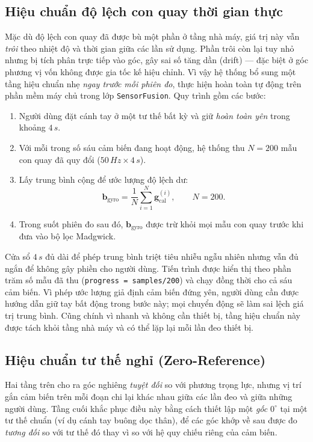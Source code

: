 \documentclass[../DoAn.tex]{subfiles}
\begin{document}
\subsection{Hiệu chuẩn độ lệch con quay thời gian thực}
\label{subsec:impl_runtime}
Mặc dù độ lệch con quay đã được bù một phần ở tầng nhà máy, giá trị này vẫn \emph{trôi} theo nhiệt độ và thời gian giữa các lần sử dụng. Phần trôi còn lại tuy nhỏ nhưng bị tích phân trực tiếp vào góc, gây sai số tăng dần (drift) --- đặc biệt ở góc phương vị vốn không được gia tốc kế hiệu chỉnh. Vì vậy hệ thống bổ sung một tầng hiệu chuẩn nhẹ \emph{ngay trước mỗi phiên đo}, thực hiện hoàn toàn tự động trên phần mềm máy chủ trong lớp \texttt{SensorFusion}. Quy trình gồm các bước:
\begin{enumerate}
    \item Người dùng đặt cánh tay ở một tư thế bất kỳ và giữ \emph{hoàn toàn yên} trong khoảng $4\,\si{s}$.
    \item Với mỗi trong số sáu cảm biến đang hoạt động, hệ thống thu $N = 200$ mẫu con quay đã quy đổi ($50\,\si{Hz}\times 4\,\si{s}$).
    \item Lấy trung bình cộng để ước lượng độ lệch dư:
          \begin{equation}
              \mathbf{b}_{\mathrm{gyro}} = \frac{1}{N}\sum_{i=1}^{N}\mathbf{g}_{\mathrm{cal}}^{(i)}, \qquad N = 200.
              \label{eq:runtimebias}
          \end{equation}
    \item Trong suốt phiên đo sau đó, $\mathbf{b}_{\mathrm{gyro}}$ được trừ khỏi mọi mẫu con quay trước khi đưa vào bộ lọc Madgwick.
\end{enumerate}
Cửa sổ $4\,\si{s}$ đủ dài để phép trung bình triệt tiêu nhiễu ngẫu nhiên nhưng vẫn đủ ngắn để không gây phiền cho người dùng. Tiến trình được hiển thị theo phần trăm số mẫu đã thu (\texttt{progress = samples/200}) và chạy đồng thời cho cả sáu cảm biến. Vì phép ước lượng giả định cảm biến đứng yên, người dùng cần được hướng dẫn giữ tay bất động trong bước này; mọi chuyển động sẽ làm sai lệch giá trị trung bình. Cũng chính vì nhanh và không cần thiết bị, tầng hiệu chuẩn này được tách khỏi tầng nhà máy và có thể lặp lại mỗi lần đeo thiết bị.

\subsection{Hiệu chuẩn tư thế nghỉ (Zero-Reference)}
\label{subsec:impl_zeroref}
Hai tầng trên cho ra góc nghiêng \emph{tuyệt đối} so với phương trọng lực, nhưng vị trí gắn cảm biến trên mỗi đoạn chi lại khác nhau giữa các lần đeo và giữa những người dùng. Tầng cuối khắc phục điều này bằng cách thiết lập một \emph{gốc} $0^{\circ}$ tại một tư thế chuẩn (ví dụ cánh tay buông dọc thân), để các góc khớp về sau được đo \emph{tương đối} so với tư thế đó thay vì so với hệ quy chiếu riêng của cảm biến.
\end{document}
